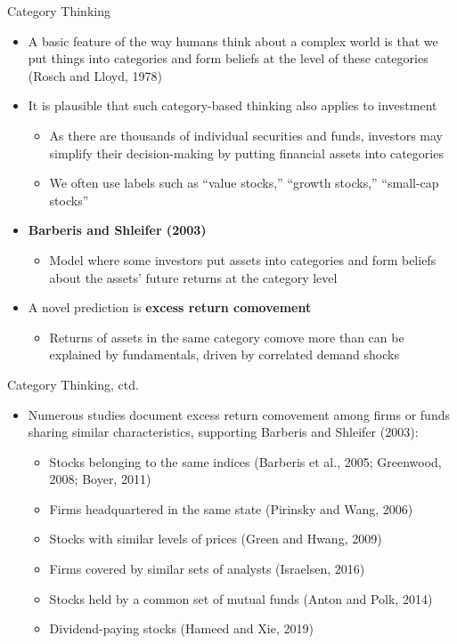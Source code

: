 \documentclass[aspectratio=169, 11pt]{beamer}
\begin{document}
\begin{frame}{Category Thinking}
\begin{itemize}
\item A basic feature of the way humans think about a complex world is that we put things into categories and form beliefs at the level of these categories (Rosch and Lloyd, 1978)
\item It is plausible that such category-based thinking also applies to investment
  \begin{itemize}
  \item As there are thousands of individual securities and funds, investors may simplify their decision-making by putting financial assets into categories
  \item We often use labels such as ``value stocks,'' ``growth stocks,'' ``small-cap stocks''
  \end{itemize}
\item \textbf{Barberis and Shleifer (2003)}
  \begin{itemize}
  \item Model where some investors put assets into categories and form beliefs about the assets' future returns at the category level
  \end{itemize}
\item A novel prediction is \textbf{excess return comovement}
  \begin{itemize}
  \item Returns of assets in the same category comove more than can be explained by fundamentals, driven by correlated demand shocks
  \end{itemize}
\end{itemize}
\end{frame}

\begin{frame}{Category Thinking, ctd.}
\begin{itemize}
\item Numerous studies document excess return comovement among firms or funds sharing similar characteristics, supporting Barberis and Shleifer (2003):
  \begin{itemize}
  \item Stocks belonging to the same indices (Barberis et al., 2005; Greenwood, 2008; Boyer, 2011)
  \item Firms headquartered in the same state (Pirinsky and Wang, 2006)
  \item Stocks with similar levels of prices (Green and Hwang, 2009)
  \item Firms covered by similar sets of analysts (Israelsen, 2016)
  \item Stocks held by a common set of mutual funds (Anton and Polk, 2014)
  \item Dividend-paying stocks (Hameed and Xie, 2019)
  \end{itemize}
\end{itemize}
\end{frame}
\end{document}
